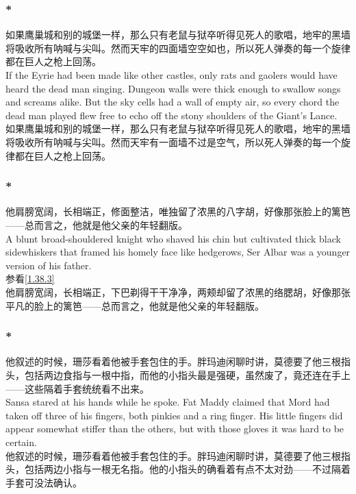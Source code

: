 \documentclass[12pt,a4paper]{article}
\newcommand{\h}[1]{{\color{red}#1}\\}
\newcommand{\la}[1]{{\color{blue}#1}\\}
\begin{document}
\subsubsection{\color{red}*}\la{
	如果鹰巢城和别的城堡一样，那么只有老鼠与狱卒听得见死人的歌唱，地牢的黑墙将吸收所有呐喊与尖叫。然而天牢的四面墙空空如也，所以死人弹奏的每一个旋律都在巨人之枪上回荡。\\
	If the Eyrie had been made like other castles, only rats and gaolers would have heard the dead man singing. Dungeon walls were thick enough to swallow songs and screams alike.  But the sky cells had a wall of empty air, so every chord the dead man played flew free to echo off the stony shoulders of the Giant's Lance. }
	如果鹰巢城和别的城堡一样，那么只有老鼠与狱卒听得见死人的歌唱，地牢的黑墙将吸收所有呐喊与尖叫。然而天牢有一面墙不过是空气，所以死人弹奏的每一个旋律都在巨人之枪上回荡。
		
\subsubsection{\color{red}*}\label{4.10.2}\la{
	他肩膀宽阔，长相端正，修面整洁，唯独留了浓黑的八字胡，好像那张脸上的篱笆——总而言之，他就是他父亲的年轻翻版。\\
	A blunt broad-shouldered knight who shaved his chin but cultivated thick black sidewhiskers that framed his homely face like hedgerows, Ser Albar was a younger version of his father.}\h{
	参看\ref{1.38.3}}
	他肩膀宽阔，长相端正，下巴剃得干干净净，两颊却留了浓黑的络腮胡，好像那张平凡的脸上的篱笆——总而言之，他就是他父亲的年轻翻版。

\subsubsection{\color{red}*}\la{
	他叙述的时候，珊莎看着他被手套包住的手。胖玛迪闲聊时讲，莫德要了他三根指头，包括两边食指与一根中指，而他的小指头最是强硬，虽然废了，竟还连在手上——这些隔着手套统统看不出来。\\
	Sansa stared at his hands while he spoke. Fat Maddy claimed that Mord had taken off three of his fingers, both pinkies and a ring finger. His little fingers did appear somewhat stiffer than the others, but with those gloves it was hard to be certain.}
他叙述的时候，珊莎看着他被手套包住的手。胖玛迪闲聊时讲，莫德要了他三根指头，包括两边小指与一根无名指。他的小指头的确看着有点不太对劲——不过隔着手套可没法确认。
\end{document}
